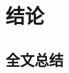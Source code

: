 
\chapter{结论}
\thispagestyle{plain}
\renewcommand{\currentchapter}{\thechapter 结论}
\label{cha:conclusion}

\section{全文总结}
\label{sec:conclusion}
